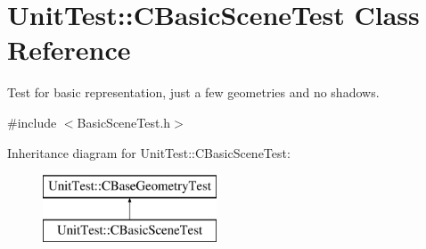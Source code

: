 \hypertarget{class_unit_test_1_1_c_basic_scene_test}{}\section{Unit\+Test\+::C\+Basic\+Scene\+Test Class Reference}
\label{class_unit_test_1_1_c_basic_scene_test}


Test for basic representation, just a few geometries and no shadows.  




{\ttfamily \#include $<$Basic\+Scene\+Test.\+h$>$}

Inheritance diagram for Unit\+Test\+::C\+Basic\+Scene\+Test\+:\begin{figure}[H]
\begin{center}
\leavevmode
\includegraphics[height=2.000000cm]{class_unit_test_1_1_c_basic_scene_test}
\end{center}
\end{figure}
